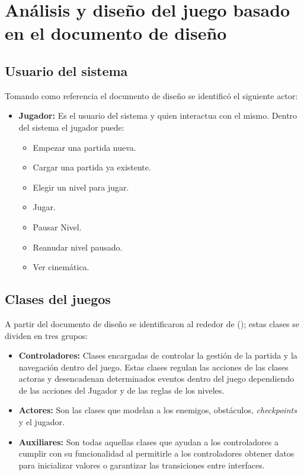 \section{Análisis y diseño del juego basado en el documento de diseño}	


	\subsection{Usuario del sistema}
	Tomando como referencia el documento de diseño se identificó el siguiente actor:
	\begin{itemize}
		\item \textbf{Jugador:} Es el usuario del sistema y quien interactua con
		el mismo. Dentro del sistema el jugador puede: 
			\begin{itemize}
				\item Empezar una partida nueva.	
				\item Cargar una partida ya existente.
				\item Elegir un nivel para jugar.  
				\item Jugar.
				\item Pausar Nivel.
				\item Reanudar nivel pausado.
				\item Ver cinemática.
			\end{itemize}			   
	\end{itemize}	
	
	\subsection{Clases del juegos}
	A partir del documento de diseño se identificaron al rededor de (); estas 
	clases se dividen en tres grupos:
		\begin{itemize}
			\item \textbf{Controladores:} Clases encargadas de controlar la gestión de 
			la partida y la navegación dentro del juego. Estas clases regulan las acciones 
			de las clases actoras y desencadenan determinados eventos dentro del juego
			dependiendo de las acciones del Jugador y de las reglas de los niveles.
			
			\item \textbf{Actores:} Son las clases que modelan a los enemigos, obstáculos,
			\textit{checkpoints} y el jugador.
			 
			 \item \textbf{Auxiliares:} Son todas aquellas clases que ayudan a los controladores
			 a cumplir con su funcionalidad al permitirle a los controladores obtener datos 
			 para inicializar valores o garantizar las transiciones entre interfaces.
		\end{itemize}
		
